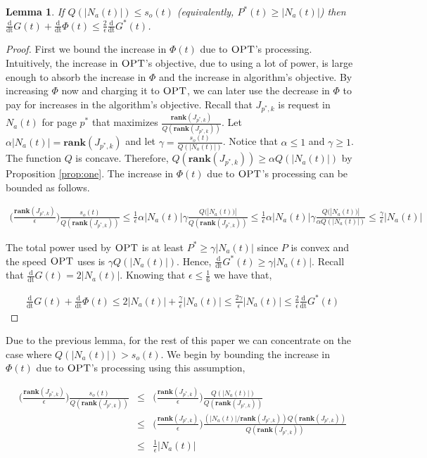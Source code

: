 \documentclass[11pt]{article}
\newtheorem{lemma}{Lemma}[section]
\newcommand{\opt}{\textrm{\sc OPT}}
\newcommand{\eps}{\epsilon}
\newcommand{\ddphi}{\frac{\mathrm{d}}{\mathrm{dt}} \Phi}
\newcommand{\ddopt}{\frac{\mathrm{d}}{\mathrm{dt}} G^*}
\newcommand{\ddhopt}{\frac{\mathrm{d}}{\mathrm{dt}} G^*}
\newcommand{\ddg}{\frac{\mathrm{d}}{\mathrm{dt}} G}
\newcommand{\rank}{\mathbf{rank}}
\begin{document}
\begin{lemma}
\label{lem:optpower}
If $Q(|N_a(t)|) \leq  s_o(t)$ (equivalently, $P^*(t) \geq |N_a(t)|$) then $\ddg(t) + \ddphi(t) \leq \frac{2}{\eps} \ddhopt(t)$.
\end{lemma}
\begin{proof}
First we bound the increase in $\Phi(t)$ due to $\opt$'s processing. Intuitively, the increase in $\opt$'s objective, due to using a lot of power, is large enough to absorb the increase in $\Phi$ and  the increase in algorithm's  objective.  By increasing $\Phi$ now and charging it to $\opt$, we can later use the decrease in $\Phi$ to pay for increases in the algorithm's objective. Recall that $J_{p^*,k}$ is request in $N_a(t)$ for page $p^*$ that maximizes $\frac{\rank(J_{p^*,k})}{Q(\rank(J_{p^*,k}))}$.  Let $\alpha |N_a(t)| = \rank(J_{p^*,k})$ and let $\gamma  = \frac{s_o(t)}{Q(|N_a(t)|)}$.    Notice that $\alpha \leq 1$ and $\gamma \geq 1$.    The function $Q$ is concave.  Therefore, $Q(\rank(J_{p^*,k})) \geq \alpha Q(|N_a(t)|)$ by Proposition \ref{prop:one}.  The increase in $\Phi(t)$ due to $\opt$'s processing can be bounded as follows.
   
\begin{eqnarray*}
\Big(\frac{\rank(J_{p^*,k})}{\eps} \Big ) \frac{s_o(t)}{Q(\rank(J_{p^*,k}))} \leq \frac{1}{\eps}\alpha |N_a(t)| \gamma \frac{Q(|N_a(t))|}{Q(\rank(J_{p^*,k}))} \leq \frac{1}{\eps}\alpha |N_a(t)| \gamma \frac{Q(|N_a(t))|}{\alpha Q(|N_a(t)|)}  \leq  \frac{\gamma}{\eps} |N_a(t)| 
\end{eqnarray*}

The total power used by $\opt$ is at least $P^* \geq \gamma |N_a(t)|$ since $P$ is convex and the speed $\opt$ uses is $\gamma Q(|N_a(t)|)$. Hence, $\ddhopt(t) \geq \gamma|N_a(t)|$. Recall that $\ddg(t)= 2|N_a(t)|$.  Knowing that $\eps \leq \frac{1}{6}$ we have that,

\begin{eqnarray*}
\ddg(t) + \ddphi(t)  \leq 2 |N_a(t)| + \frac{\gamma}{\eps} |N_a(t)| \leq \frac{2 \gamma}{\eps} |N_a(t)| \leq \frac{2}{\eps}\ddopt(t)
\end{eqnarray*}

\end{proof}


Due to the previous lemma, for the rest of this paper we can concentrate on the case where $Q(|N_a(t)|) >  s_o(t)$.  We begin by bounding the increase in $\Phi(t)$ due to $\opt$'s processing using this assumption,


\begin{eqnarray}
\Big ( \frac{\rank(J_{p^*,k})}{\eps} \Big ) \frac{s_o(t)}{Q(\rank(J_{p^*,k}))} &\leq& \Big ( \frac{\rank(J_{p^*,k})}{\eps} \Big ) \frac{Q(|N_a(t)|)}{Q(\rank(J_{p^*,k}))} \nonumber \\
 &\leq&   \Big ( \frac{\rank(J_{p^*,k})}{\eps} \Big ) \frac{(|N_a(t)|/\rank(J_{p^*,k}))Q(\rank(J_{p^*,k}))}{Q(\rank(J_{p^*,k}))} \nonumber \\
 &\leq& \frac{1}{\eps} |N_a(t)| \label{eqn:optproc}
\end{eqnarray}
\end{document}
